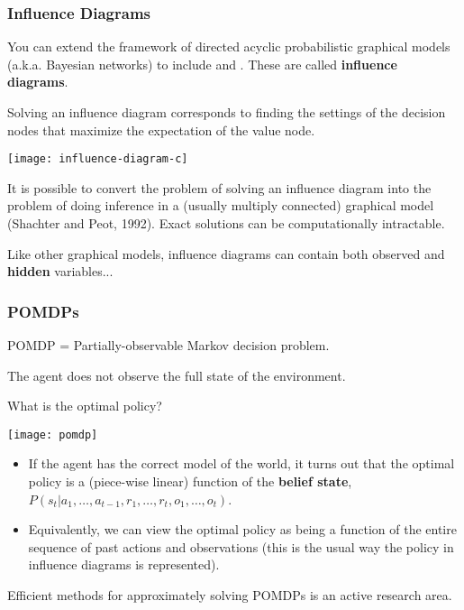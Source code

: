 \begin{frame}
\frametitle{Influence Diagrams}

\parbox{2.7in}{You can extend the framework of directed acyclic probabilistic
graphical models (a.k.a. Bayesian networks) to include  and . These are called {\bf influence
diagrams}.

Solving an influence diagram corresponds to finding the settings of the
decision nodes that maximize the expectation of the value node.}
\parbox{2in}{\centerline{\texttt{[image: influence-diagram-c]}}}

It is possible to convert the problem of solving an influence diagram
into the problem of doing inference in a (usually
multiply connected)  graphical model (Shachter and Peot, 1992). Exact
solutions can be computationally intractable.

Like other graphical models, influence diagrams can contain both
observed and {\bf hidden} variables...
\end{frame}

\begin{frame}
\frametitle{POMDPs}

\parbox{2.4in}{
POMDP = Partially-observable Markov decision problem.

The agent does not observe the full state of the environment.

What is the optimal policy? 
}
\parbox{2.4in}{
\centerline{\texttt{[image: pomdp]}}}

\begin{itemize}
\item If the agent has the correct model of the world, it turns out that the
optimal policy is a (piece-wise linear) function of the {\bf belief
state}, $P(s_t| a_1, \ldots, a_{t-1}, r_1, \ldots, r_{t}, o_1,
\ldots, o_{t})$.\\

\item Equivalently, we can view the optimal policy as being a function
of the entire sequence of past actions and observations (this is the
usual way the policy in influence diagrams is represented).\\ 
\end{itemize}

Efficient methods for approximately solving POMDPs is an active research area.
\end{frame}

